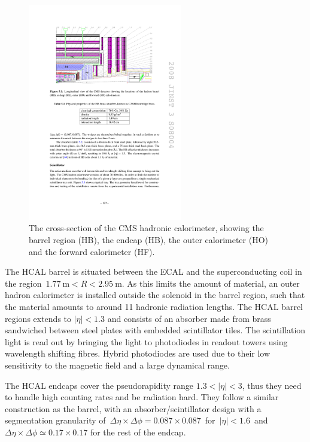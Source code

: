 \begin{figure}
\begin{centering}
\includegraphics[width=0.6\textwidth]{figures/exp/hcal.pdf}
\caption[The cross-section of the CMS hadronic calorimeter]{The cross-section of the CMS hadronic calorimeter, showing the barrel region (HB), the endcap (HB), the outer calorimeter (HO) and the forward calorimeter (HF).}
\label{fig:hcal}
\end{centering}
\end{figure}


The HCAL barrel is situated between the ECAL and the superconducting coil in the region~$1.77~\mathrm{m} < R < 2.95~\mathrm{m}$. As this limits the amount of material, an outer hadron calorimeter is installed outside the solenoid in the barrel region, such that the material amounts to around 11 hadronic radiation lengths. The HCAL barrel regions extends to $|\eta| < 1.3$ and consists of an absorber made from brass sandwiched between steel plates with embedded scintillator tiles. The scintillation light is read out by bringing the light to photodiodes in readout towers using wavelength shifting fibres. Hybrid photodiodes are used due to their low sensitivity to the magnetic field and a large dynamical range.

The HCAL endcaps cover the pseudorapidity range $1.3 < |\eta| < 3$, thus they need to handle high counting rates and be radiation hard. They follow a similar construction as the barrel, with an absorber/scintillator design with a segmentation granularity of~$\Delta \eta \times \Delta \phi = 0.087 \times 0.087$~for~$|\eta| < 1.6$~and~$\Delta \eta \times \Delta \phi \simeq 0.17 \times 0.17$ for the rest of the endcap.

